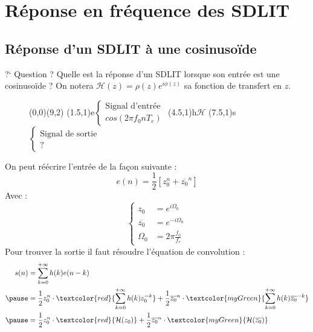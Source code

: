 \documentclass[a4paper,11pt]{beamer}
\begin{document}
\section{Réponse en fréquence des SDLIT}
\subsection{Réponse d'un SDLIT à une cosinusoïde}
 
\begin{frame}
\begin{exampleblock}{?` Question ?}
\justifying
Quelle est la réponse d'un SDLIT lorsque son entrée est une cosinusoïde ?
On notera $\mathcal{H}(z)=\rho(z)e^{i\phi (z)}$ sa fonction de transfert en $z$.
\begin{figure}
	\begin{pspicture}[showgrid=false](0,0)(9,2)
		\pssignal(1.5,1){e}{$\begin{cases}
		\text{Signal d'entrée}\\
		cos(2\pi f_0 nT_e)
		\end{cases}$}
		\psfblock[framesize=1.75 1.65](4.5,1){h}{$\mathcal{H}$}
		\pssignal(7.5,1){s}{$\begin{cases}
		\text{Signal de sortie}\\
		?
		\end{cases}$}
	\end{pspicture}
\end{figure}
\end{exampleblock}
\end{frame}

\begin{frame}
\justifying
On peut réécrire l'entrée de la façon suivante :
$$
e(n) = \frac{1}{2}[z_0^n+ \overline{z_0}^n]
$$
Avec :
$$
\begin{cases}
z_0 &= e^{i\Omega_0}\\
\overline{z_0} &= e^{-i\Omega_0}\\
\Omega_0 &= 2\pi \frac{f_0}{f_e}
\end{cases}
$$
\pause
Pour trouver la sortie il faut résoudre l'équation de convolution :
$$
\begin{aligned}
s(n) &= \sum_{k=0}^{+\infty} h(k)e(n-k)\\
\pause
	 &= \frac{1}{2}z_0^n\cdot\textcolor{red}{\sum_{k=0}^{+\infty} h(k)z_0^{-k}} +
	 \frac{1}{2}\overline{z_0}^n\cdot\textcolor{myGreen}{\sum_{k=0}^{+\infty} h(k)\overline{z_0}^{-k}}\\
\pause
	 &= \frac{1}{2}z_0^n \cdot\textcolor{red}{\mathcal{H}(z_0)} + \frac{1}{2}\overline{z_0}^n
	 \cdot\textcolor{myGreen}{\mathcal{H}(\overline{z_0})}
\end{aligned}
$$
\end{frame}
\end{document}
